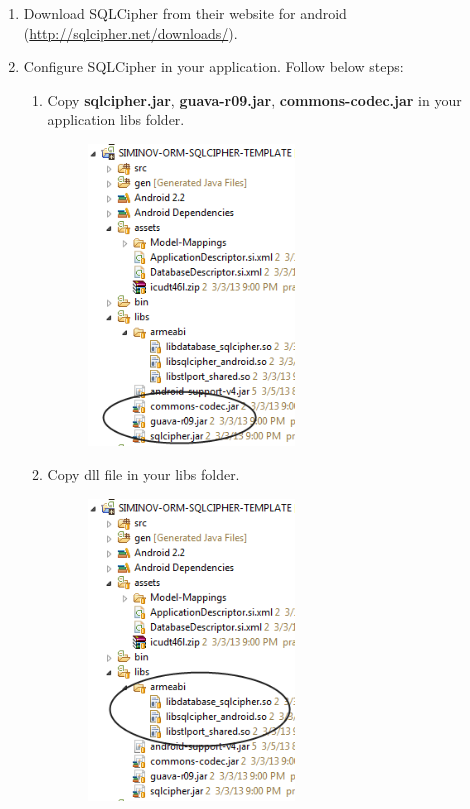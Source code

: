 \begin{enumerate}

	\item \small Download SQLCipher from their website for android (\url{http://sqlcipher.net/downloads/}).

	\item \small Configure SQLCipher in your application. Follow below steps:

		\begin{enumerate}

			\newpage
			\item \small Copy \textbf{sqlcipher.jar}, \textbf{guava-r09.jar}, \textbf{commons-codec.jar} in your application libs folder.

				\begin{figure}[!htbp]
					\centering
						\includegraphics[height=8cm]{Resources/siminov_template_sqlcipher_application_setup_1.png}
					\end{figure}

			\item \small Copy dll file in your libs folder. 

				\begin{figure}[!htbp]
					\centering
						\includegraphics[height=8cm]{Resources/siminov_template_sqlcipher_application_setup_2.png}
					\end{figure}


\end{enumerate}
\end{enumerate}
